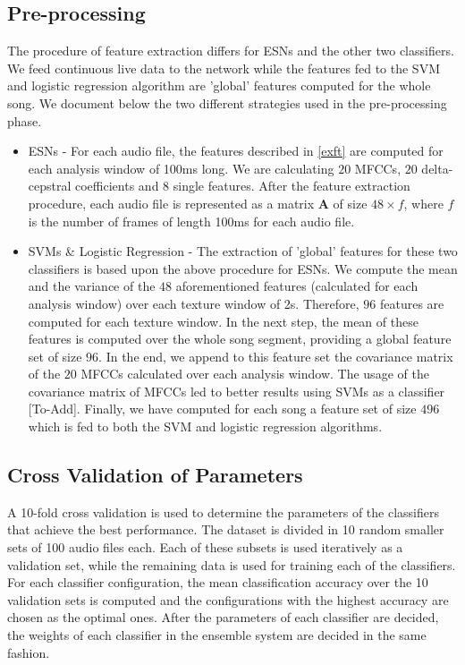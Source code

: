 \documentclass[a4paper,11pt,oneside]{article}
\begin{document}
\subsection{Pre-processing}
The procedure of feature extraction differs for ESNs and the other two classifiers.
We feed continuous live data to the network while the features fed to the SVM and logistic regression
algorithm are 'global' features computed for the whole song. We document below the two different strategies
used in the pre-processing phase.
\begin{itemize}
  \item ESNs - For each audio file, the features described in \ref{exft} are computed for 
  each analysis window of 100ms long. We are calculating $20$ MFCCs, $20$ delta-cepstral
  coefficients and $8$ single features. After the feature extraction procedure, each audio file
  is represented as a matrix $\mathbf{A}$ of size $48\times f$, where $f$ is the number of frames
  of length 100ms for each audio file. 
  \item SVMs \& Logistic Regression - The extraction of 'global' features for these two classifiers 
  is based upon the above procedure for ESNs. We compute the mean and the variance of the $48$
  aforementioned features (calculated for each analysis window) over each texture window of 2s.
  Therefore, $96$ features are computed for each texture window. In the next step, the mean of these
  features is computed over the whole song segment, providing a global feature set of size $96$.
  In the end, we append to this feature set the covariance matrix of the $20$ MFCCs
  calculated over each analysis window. The usage of the covariance matrix of MFCCs led to better results
  using SVMs as a classifier [To-Add]. Finally, we have computed for each song a feature set of size $496$ which
  is fed to both the SVM and logistic regression algorithms.
\end{itemize}
\subsection{Cross Validation of Parameters}
A 10-fold cross validation is used to determine the parameters of the classifiers 
that achieve the best performance. The dataset is divided in 10 random smaller sets of 
100 audio files each. Each of these subsets is used iteratively as a validation set, while
the remaining data is used for training each of the classifiers. For each classifier configuration,
the mean classification accuracy over the 10 validation sets is computed and the configurations with 
the highest accuracy are chosen as the optimal ones. After the parameters of each classifier are 
decided, the weights of each classifier in the ensemble system are decided in the same fashion.
\end{document}
